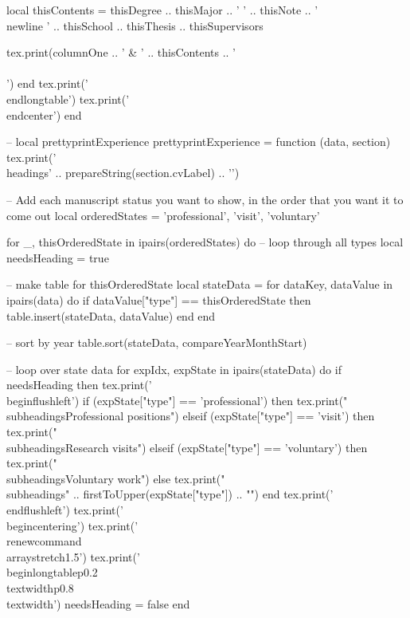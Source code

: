\documentclass[letterpaper, 10pt]{article}
\newcommand{\headings}[1]{\section*{#1} \hrule \vspace{10pt}}
\newcommand{\subheadings}[1]{\textbf{#1} \vspace{5pt}}
\begin{document}
\begin{luacode}
			local thisContents = thisDegree .. thisMajor .. ' ' .. thisNote .. '\\newline ' ..
								 thisSchool ..
								 thisThesis ..
								 thisSupervisors

			tex.print(columnOne .. ' & ' .. thisContents .. ' \\\\')
		end
		tex.print('\\end{longtable}')
		tex.print('\\end{center}')
	end

	-- local prettyprintExperience
	prettyprintExperience = function (data, section)
		tex.print('\\headings{' .. prepareString(section.cvLabel) .. '}')

		-- Add each manuscript status you want to show, in the order that you want it to come out
		local orderedStates = {'professional', 'visit', 'voluntary'}

		for _, thisOrderedState in ipairs(orderedStates) do 											-- loop through all types
			local needsHeading = true

			-- make table for thisOrderedState
			local stateData = {}
			for dataKey, dataValue in ipairs(data) do
				if dataValue["type"] == thisOrderedState then
					table.insert(stateData, dataValue)
				end
			end

			-- sort by year
			table.sort(stateData, compareYearMonthStart)

			-- loop over state data
			for expIdx, expState in ipairs(stateData) do
				if needsHeading then
					tex.print('\\begin{flushleft}')
					if (expState["type"] == 'professional') then
						tex.print("\\subheadings{Professional positions}")
					elseif (expState["type"] == 'visit') then
						tex.print("\\subheadings{Research visits}")
					elseif (expState["type"] == 'voluntary') then
						tex.print("\\subheadings{Voluntary work}")
					else
						tex.print("\\subheadings{" .. firstToUpper(expState["type"]) .. "}")
					end
					tex.print('\\end{flushleft}')
					tex.print('\\begin{centering}')
					tex.print('\\renewcommand{\\arraystretch}{1.5}')
					tex.print('\\begin{longtable}{p{0.2\\textwidth}p{0.8\\textwidth}}')
					needsHeading = false
				end


\end{luacode}
\end{document}
